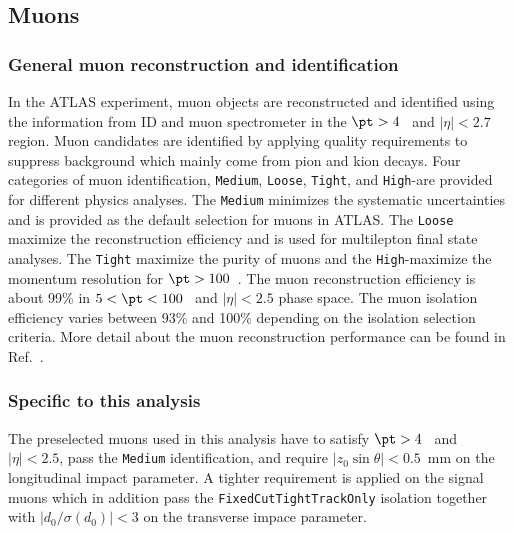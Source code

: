 
\subsection{Muons}
\label{subsec:event_muons}


\subsubsection{General muon reconstruction and identification}
\label{subsubsec:event_muons_general}
In the ATLAS experiment, muon objects are reconstructed and identified using the information from ID and muon spectrometer in the $\pt > 4$~{\GeV} and $|\eta| < 2.7$ region.
Muon candidates are identified by applying quality requirements to suppress background which mainly come from pion and kion decays.
Four categories of muon identification, \texttt{Medium}, \texttt{Loose}, \texttt{Tight}, and \texttt{High}-\pt are provided for different physics analyses.
The \texttt{Medium} minimizes the systematic uncertainties and is provided as the default selection for muons in ATLAS.
The \texttt{Loose} maximize the reconstruction efficiency and is used for multilepton final state analyses.
The \texttt{Tight} maximize the purity of muons and the \texttt{High}-\pt maximize the momentum resolution for $\pt > 100$~{\GeV}.
The muon reconstruction efficiency is about 99\% in $5 < \pt < 100$~{\GeV} and $|\eta| < 2.5$ phase space.
The muon isolation efficiency varies between 93\% and 100\% depending on the isolation selection criteria.
More detail about the muon reconstruction performance can be found in Ref.~\cite{Aad:2016jkr}.


\subsubsection{Specific to this analysis}
\label{subsubsec:event_muons_specific}
The preselected muons used in this analysis have to satisfy $\pt > 4$~{\GeV} and $|\eta| < 2.5$, pass the \texttt{Medium} identification, and require $|z_{0}\sin\theta| < 0.5$~mm on the longitudinal impact parameter.
A tighter requirement is applied on the signal muons which in addition pass the \texttt{FixedCutTightTrackOnly} isolation together with $|d_{0}/\sigma(d_{0})| < 3$ on the transverse impace parameter.

